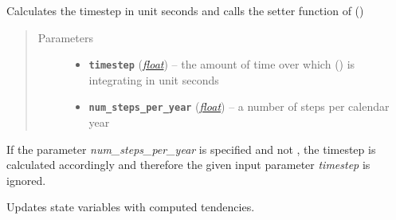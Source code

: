 \documentclass[a4paper,10pt,english]{sphinxmanual}
\begin{document}
\begin{fulllineitems}
\begin{fulllineitems}
\label{api/climlab.process:climlab.process.time_dependent_process.TimeDependentProcess.set_timestep}
Calculates the timestep in unit seconds
and calls the setter function of {\hyperref[api/climlab.process:climlab.process.time_dependent_process.TimeDependentProcess.timestep]{\emph{}}} ()
\begin{quote}\begin{description}
\item[{Parameters}] \leavevmode\begin{itemize}
\item {} 
\textbf{\texttt{timestep}} (\href{http://docs.python.org/2.7/library/functions.html\#float}{\emph{float}}) -- the amount of time over which 
{\hyperref[api/climlab.process:climlab.process.time_dependent_process.TimeDependentProcess.step_forward]{\emph{}}} () is integrating 
in unit seconds

\item {} 
\textbf{\texttt{num\_steps\_per\_year}} (\href{http://docs.python.org/2.7/library/functions.html\#float}{\emph{float}}) -- a number of steps per calendar year

\end{itemize}

\end{description}\end{quote}

If the parameter \emph{num\_steps\_per\_year} is specified and not , 
the timestep is calculated accordingly and therefore the given input
parameter \emph{timestep} is ignored.

\end{fulllineitems}


\begin{fulllineitems}
\label{api/climlab.process:climlab.process.time_dependent_process.TimeDependentProcess.step_forward}
Updates state variables with computed tendencies.


\end{fulllineitems}
\end{fulllineitems}
\end{document}

